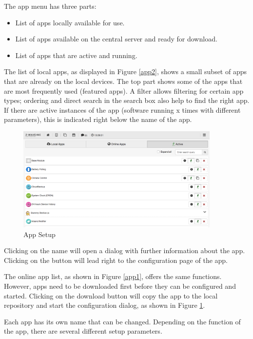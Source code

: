 The app menu has three parts:

\begin{itemize}
\item List of apps locally available for use.
\item List of apps available on the central server and ready for download.
\item List of apps that are active and running.
\end{itemize}

The list of local apps, as displayed in Figure \ref{app2}, shows a small subset of apps that 
are already on the local devices. The top part shows some of the apps that are most 
frequently used (featured apps). A filter allows filtering for certain app types; 
ordering and direct search in the search box also help to find the right app. If 
there are active instances of the app (software running x times with different
 parameters), this is indicated right below the name of the app.

\begin{figure}
\begin{center}
\includegraphics[width=0.9\textwidth]{pngs/cap4/app3.png}
\caption{App Setup}
\label{app3}
\end{center}
\end{figure}

Clicking on the name will open a dialog with further information about the app. Clicking 
on the \keystroke{+} button will lead right to the configuration page of the app.

The online app list, as shown in Figure \ref{app1}, offers the same functions. However, 
apps need to be downloaded first before they can be configured and started. Clicking on 
the download button will copy the app to the local repository and start the configuration 
dialog, as shown in Figure \ref{app3}.

Each app has its own name that can be changed. Depending on the function of the app, 
there are several different setup parameters.


